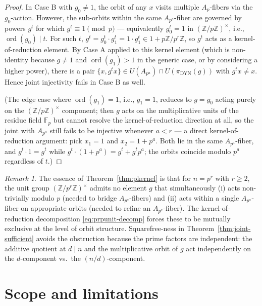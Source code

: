 \documentclass[11pt,reqno]{amsart}
\theoremstyle{plain}
\theoremstyle{definition}
\theoremstyle{remark}
\newtheorem{remark}[theorem]{Remark}
\DeclareMathOperator{\ord}{ord}
\DeclareMathOperator{\dyn}{DYN}
\newcommand{\Z}{\mathbb{Z}}
\newcommand{\F}{\mathbb{F}}
\begin{document}
\begin{proof}
In Case B with $g_{0} \ne 1$, the orbit of any $x$ visits multiple
$A_{p}$-fibers via the $g_{0}$-action. However, the sub-orbits within
the same $A_{p^{a}}$-fiber are governed by powers $g^{t}$ for which
$g^{t} \equiv 1 \pmod{p}$ --- equivalently $g_{0}^{t} = 1$ in
$(\Z/p\Z)^{\times}$, i.e., $\ord(g_{0}) \mid t$. For such $t$,
$g^{t} = g_{0}^{t} \cdot g_{1}^{t} = 1 \cdot g_{1}^{t} \in
1 + p\Z/p^{r}\Z$, so $g^{t}$ acts as a kernel-of-reduction element.
By Case A applied to this kernel element (which is non-identity
because $g \ne 1$ and $\ord(g_{1}) > 1$ in the generic case, or by
considering a higher power), there is a pair $\{x, g^{t} x\} \in
U(A_{p^{a}}) \cap U(\pi_{\dyn}(g))$ with $g^{t} x \ne x$. Hence joint
injectivity fails in Case B as well.

(The edge case where $\ord(g_{1}) = 1$, i.e., $g_{1} = 1$, reduces
to $g = g_{0}$ acting purely on the $(\Z/p\Z)^{\times}$ component;
then $g$ acts on the multiplicative units of the residue field
$\F_{p}$ but cannot resolve the kernel-of-reduction direction at all,
so the joint with $A_{p^{a}}$ still fails to be injective whenever
$a < r$ --- a direct kernel-of-reduction argument: pick $x_{1} = 1$
and $x_{2} = 1 + p^{a}$. Both lie in the same $A_{p^{a}}$-fiber, and
$g^{t} \cdot 1 = g^{t}$ while $g^{t} \cdot (1 + p^{a}) = g^{t} +
g^{t} p^{a}$; the orbits coincide modulo $p^{a}$ regardless of $t$.)
\end{proof}

\begin{remark}\label{rem:pkernel-essence}
The essence of Theorem~\ref{thm:pkernel} is that for $n = p^{r}$ with
$r \ge 2$, the unit group $(\Z/p^{r}\Z)^{\times}$ admits no element
$g$ that simultaneously (i) acts non-trivially modulo $p$ (needed to
bridge $A_{p^{a}}$-fibers) and (ii) acts within a single
$A_{p^{a}}$-fiber on appropriate orbits (needed to refine an
$A_{p^{a}}$-fiber). The kernel-of-reduction decomposition
\eqref{eq:prpunit-decomp} forces these to be mutually exclusive at
the level of orbit structure. Squarefree-ness in
Theorem~\ref{thm:joint-sufficient} avoids the obstruction because
the prime factors are independent: the additive quotient at
$d \mid n$ and the multiplicative orbit of $g$ act independently on
the $d$-component vs.\ the $(n/d)$-component.
\end{remark}

\section{Scope and limitations}\label{sec:scope}
\end{document}
